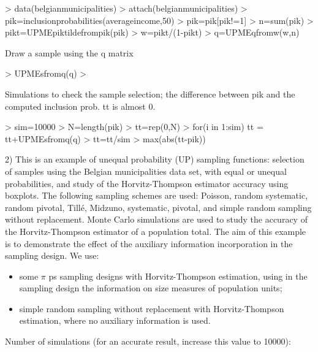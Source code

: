 \documentclass[a4paper]{article}
\begin{document}
\begin{Schunk}
\begin{Sinput}
> data(belgianmunicipalities)
> attach(belgianmunicipalities)
> pik=inclusionprobabilities(averageincome,50)
> pik=pik[pik!=1]
> n=sum(pik)
> pikt=UPMEpiktildefrompik(pik)
> w=pikt/(1-pikt)
> q=UPMEqfromw(w,n)
\end{Sinput}
\end{Schunk}
Draw a sample using the q matrix

\begin{Schunk}
\begin{Sinput}
> UPMEsfromq(q)
> 
\end{Sinput}
\end{Schunk}
Simulations to check the sample selection; the difference between pik and the computed inclusion prob. tt is almost 0.

\begin{Schunk}
\begin{Sinput}
> sim=10000
> N=length(pik)
> tt=rep(0,N)
> for(i in 1:sim) tt = tt+UPMEsfromq(q)
> tt=tt/sim
> max(abs(tt-pik))
\end{Sinput}
\end{Schunk}
2) This is an example of unequal probability (UP) sampling functions: selection of samples using the Belgian municipalities data set,
with equal or unequal probabilities, and study of the Horvitz-Thompson estimator accuracy using boxplots. The following
sampling schemes are used: Poisson, random systematic, random
pivotal, Till\'e, Midzuno, systematic, pivotal, and simple random
sampling without replacement. Monte Carlo simulations are used to study the accuracy of the
Horvitz-Thompson estimator of a population total. The aim of this
example is to demonstrate the effect of the auxiliary information incorporation in the sampling design. We use:
\begin{itemize}
\item some $\pi$ ps sampling designs with Horvitz-Thompson estimation,
using in the sampling design the information on size measures of
population units;
\item simple random sampling without replacement with Horvitz-Thompson
estimation, where no auxiliary information is used.
\end{itemize}

\begin{Schunk}
\end{Schunk}
Number of simulations (for an accurate result, increase this value to 10000):
\end{document}
